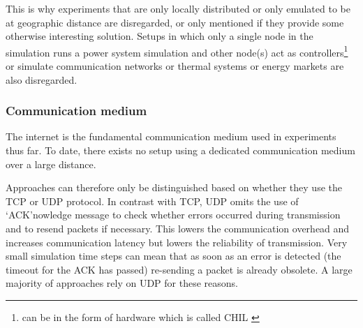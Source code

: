 \documentclass[a4paper]{atseminar}
\begin{document}
This is why experiments that are only locally distributed \cite{yang2013, lin-yu2012, jiang2016, ravikumar2009} or only emulated to be at geographic distance \cite{li2017, liu2016} are disregarded, or only mentioned if they provide some otherwise interesting solution. Setups in which only a single node in the simulation runs a power system simulation and other node(s) act as controllers\footnote{can be in the form of hardware which is called CHIL \cite{syed2020standard}} \cite{wang2020, montoya2018, pau2018, barbierato2019} or simulate communication networks \cite{nguyen2020} or thermal systems \cite{faruque2009a, faruque2009b} or energy markets \cite{vogt2019} are also disregarded.




\subsubsection{Communication medium}
\label{MH:sec:comm}

The internet is the fundamental communication medium used in experiments thus far. To date, there exists no setup using a dedicated communication medium over a large distance.

Approaches can therefore only be distinguished based on whether they use the TCP or UDP protocol.
In contrast with TCP, UDP omits the use of `ACK'nowledge message to check whether errors occurred during transmission and to resend packets if necessary. This lowers the communication overhead and increases communication latency but lowers the reliability of transmission. Very small simulation time steps can mean that as soon as an error is detected (the timeout for the ACK has passed) re-sending a packet is already obsolete. A large majority of approaches rely on UDP for these reasons.
\end{document}
